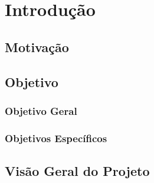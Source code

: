 \chapter{Introdução}

\section{Motivação}


\section{Objetivo}


\subsection{Objetivo Geral}


\subsection{Objetivos Específicos}


\section{Visão Geral do Projeto}
